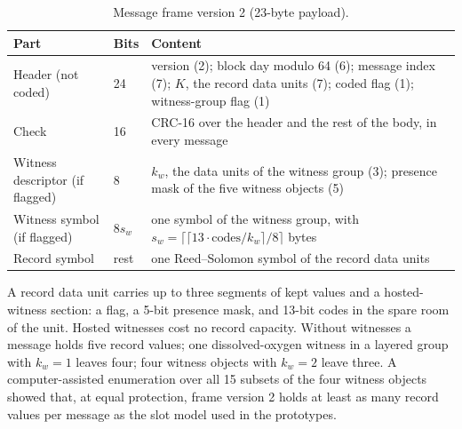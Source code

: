 \begin{table}[t]
\centering
\caption{Message frame version 2 (23-byte payload).}
\label{tab:frame}
\small
\begin{tabularx}{\textwidth}{@{}llX@{}}
\toprule
Part & Bits & Content \\
\midrule
Header (not coded) & 24 & version (2); block day modulo 64 (6); message index (7); $K$, the record data units (7); coded flag (1); witness-group flag (1) \\
Check & 16 & CRC-16 over the header and the rest of the body, in every message \\
Witness descriptor (if flagged) & 8 & $k_w$, the data units of the witness group (3); presence mask of the five witness objects (5) \\
Witness symbol (if flagged) & $8 s_w$ & one symbol of the witness group, with $s_w = \lceil \lceil 13 \cdot \text{codes} / k_w \rceil / 8 \rceil$ bytes \\
Record symbol & rest & one Reed--Solomon symbol of the record data units \\
\bottomrule
\end{tabularx}
\end{table}

A record data unit carries up to three segments of kept values and a hosted-witness section: a flag, a 5-bit presence mask, and 13-bit codes in the spare room of the unit. Hosted witnesses cost no record capacity. Without witnesses a message holds five record values; one dissolved-oxygen witness in a layered group with $k_w = 1$ leaves four; four witness objects with $k_w = 2$ leave three. A computer-assisted enumeration over all 15 subsets of the four witness objects showed that, at equal protection, frame version 2 holds at least as many record values per message as the slot model used in the prototypes.

